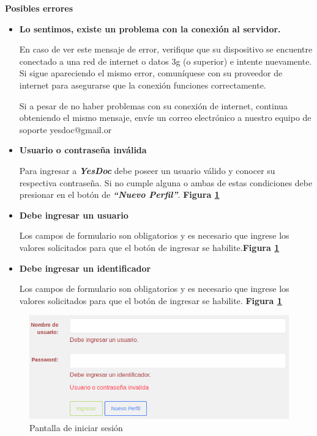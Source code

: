 \documentclass[a4paper,12pt]{article}
\begin{document}
\textbf{Posibles errores}
\begin{itemize}
	\item \textbf{Lo sentimos, existe un problema con la conexión al servidor.}
	
	En caso de ver este mensaje de error, verifique que su dispositivo se encuentre conectado a una red de internet o datos 3g (o superior) e intente nuevamente. Si sigue apareciendo el mismo error, comuníquese con su proveedor de internet para asegurarse que la conexión funciones correctamente.
	
	Si a pesar de no haber problemas con su conexión de internet, continua obteniendo el mismo mensaje, envíe un correo electrónico a nuestro equipo de soporte yesdoc@gmail.or
	
	\item \textbf{Usuario o contraseña inválida}
	
	Para ingresar a \textbf{\textit{YesDoc}} debe poseer un usuario válido y conocer su respectiva contraseña. Si no cumple alguna o ambas de estas condiciones debe presionar en el botón de \textbf{\textit{``Nuevo Perfil''}}. \textbf{Figura \ref{mu-us_invalido_ingresar_caracteres}}
	
	\item \textbf{Debe ingresar un usuario}
	
	Los campos de formulario son obligatorios y es necesario que ingrese los valores solicitados para que el botón de ingresar se habilite.\textbf{Figura \ref{mu-us_invalido_ingresar_caracteres}}
	\item \textbf{Debe ingresar un identificador}
	
	Los campos de formulario son obligatorios y es necesario que ingrese los valores solicitados para que el botón de ingresar se habilite.	\textbf{Figura \ref{mu-us_invalido_ingresar_caracteres}}
\end{itemize}
 \begin{figure}
 	\centering
 	\includegraphics[width=.8\textwidth]{img/manual_de_usuario/us_invalido_ingresar_caracteres}
 	\caption{Pantalla de iniciar sesión}
 	\label{mu-us_invalido_ingresar_caracteres}
 \end{figure}
\end{document}
